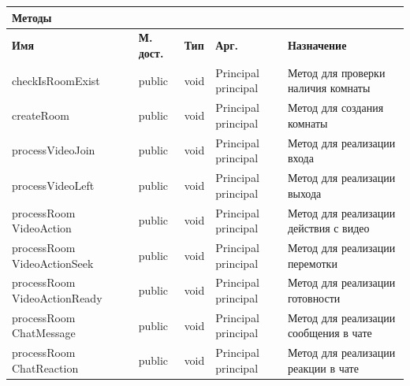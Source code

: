 \documentclass{../includes/TechDoc}
\begin{document}
\begin{table}[h]
\begin{tabularx}{\textwidth}{|p{3.5cm}|l|l|l|X|}
			\multicolumn{5}{|l|}{\textbf{Методы}} \\ \hline
			\textbf{Имя} & \textbf{М. дост.} & \textbf{Тип} & \textbf{Арг.} & \textbf{Назначение} \\ \hline
			checkIsRoomExist & public & void & Principal principal & Метод для проверки наличия комнаты \\ \hline
			createRoom & public & void & Principal principal & Метод для создания комнаты \\ \hline
			processVideoJoin & public & void & Principal principal & Метод для реализации входа \\ \hline
			processVideoLeft & public & void & Principal principal & Метод для реализации выхода \\ \hline
			processRoom VideoAction & public & void & Principal principal & Метод для реализации действия с видео \\ \hline
			processRoom VideoActionSeek & public & void & Principal principal & Метод для реализации перемотки \\ \hline
			processRoom VideoActionReady & public & void & Principal principal & Метод для реализации готовности \\ \hline
			processRoom ChatMessage & public & void & Principal principal & Метод для реализации сообщения в чате \\ \hline
			processRoom ChatReaction & public & void & Principal principal & Метод для реализации реакции в чате \\ \hline
		\end{tabularx}
    \end{table}
\end{document}
